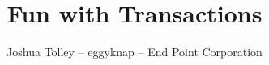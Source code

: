 \documentclass{beamer}
\begin{document}
\title{Fun with Transactions}
\author{Joshua Tolley -- eggyknap -- End Point Corporation}

\end{document}

